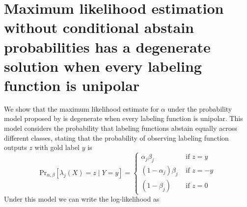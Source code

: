\section{Maximum likelihood estimation without conditional abstain probabilities has a degenerate solution when every labeling function is unipolar}
\label{appendix:degenerate_solution}

We show that the maximum likelihood estimate for $\alpha$ under the probability model proposed by \cite{Ratner16} is degenerate when every labeling function is unipolar. This model considers the probability that labeling functions abstain equally across different classes, stating that the probability of observing labeling function outputs $z$ with gold label $y$ is
\begin{equation*}
    \text{Pr}_{\alpha,\beta}[\lambda_j(X)=z\mid Y=y]=\begin{cases}
        \alpha_j\beta_j&\text{ if }z=y\\
        (1-\alpha_j)\beta_j&\text{ if }z=-y\\
        (1-\beta_j)&\text{ if }z=0
    \end{cases}
\end{equation*}
Under this model we can write the log-likelihood as
